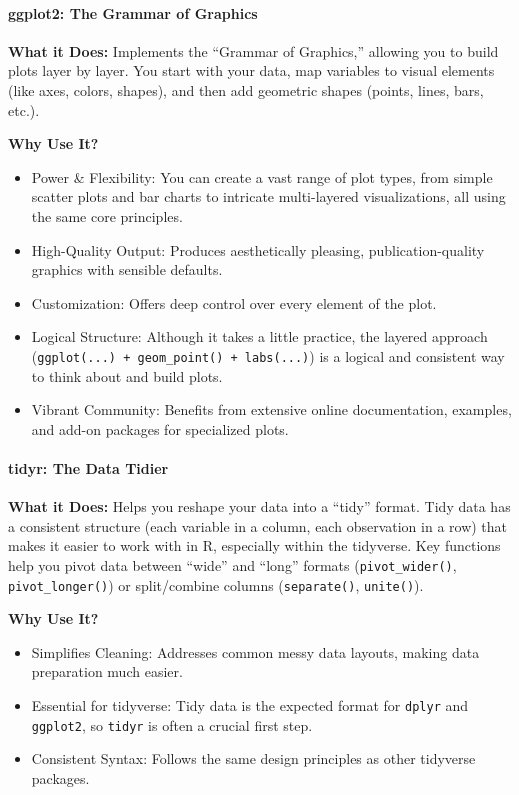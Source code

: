 \paragraph{ggplot2: The Grammar of Graphics}

\textbf{What it Does:} Implements the “Grammar of Graphics,” allowing you to build plots layer by layer. You start with your data, map variables to visual elements (like axes, colors, shapes), and then add geometric shapes (points, lines, bars, etc.).

\textbf{Why Use It?}
\begin{itemize}
    \item Power \& Flexibility: You can create a vast range of plot types, from simple scatter plots and bar charts to intricate multi-layered visualizations, all using the same core principles.
    \item High-Quality Output: Produces aesthetically pleasing, publication-quality graphics with sensible defaults.
    \item Customization: Offers deep control over every element of the plot.
    \item Logical Structure: Although it takes a little practice, the layered approach (\texttt{ggplot(...) + geom\_point() + labs(...)}) is a logical and consistent way to think about and build plots.
    \item Vibrant Community: Benefits from extensive online documentation, examples, and add-on packages for specialized plots.
\end{itemize}

\paragraph{tidyr: The Data Tidier}

\textbf{What it Does:} Helps you reshape your data into a “tidy” format. Tidy data has a consistent structure (each variable in a column, each observation in a row) that makes it easier to work with in R, especially within the tidyverse. Key functions help you pivot data between “wide” and “long” formats (\texttt{pivot\_wider()}, \texttt{pivot\_longer()}) or split/combine columns (\texttt{separate()}, \texttt{unite()}).

\textbf{Why Use It?}
\begin{itemize}
    \item Simplifies Cleaning: Addresses common messy data layouts, making data preparation much easier.
    \item Essential for tidyverse: Tidy data is the expected format for \texttt{dplyr} and \texttt{ggplot2}, so \texttt{tidyr} is often a crucial first step.
    \item Consistent Syntax: Follows the same design principles as other tidyverse packages.
\end{itemize}

